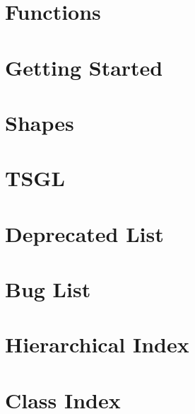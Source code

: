 \documentclass[twoside]{book}
\newcommand{\+}{\discretionary{\mbox{\scriptsize$\hookleftarrow$}}{}{}}
\begin{document}
\chapter{Functions}
\label{md__home_pretzel_workspace_tsgl__t_s_g_l_docs-wiki_tutorials__tutorial---_functions}
\hypertarget{md__home_pretzel_workspace_tsgl__t_s_g_l_docs-wiki_tutorials__tutorial---_functions}{}

\chapter{Getting Started}
\label{md__home_pretzel_workspace_tsgl__t_s_g_l_docs-wiki_tutorials__tutorial---_getting-_started}
\hypertarget{md__home_pretzel_workspace_tsgl__t_s_g_l_docs-wiki_tutorials__tutorial---_getting-_started}{}

\chapter{Shapes}
\label{md__home_pretzel_workspace_tsgl__t_s_g_l_docs-wiki_tutorials__tutorial---_shapes}
\hypertarget{md__home_pretzel_workspace_tsgl__t_s_g_l_docs-wiki_tutorials__tutorial---_shapes}{}

\chapter{T\+S\+G\+L}
\label{md__home_pretzel_workspace_tsgl__t_s_g_l_readme}
\hypertarget{md__home_pretzel_workspace_tsgl__t_s_g_l_readme}{}

\chapter{Deprecated List}
\label{deprecated}
\hypertarget{deprecated}{}

\chapter{Bug List}
\label{bug}
\hypertarget{bug}{}

\chapter{Hierarchical Index}

\chapter{Class Index}

\end{document}
